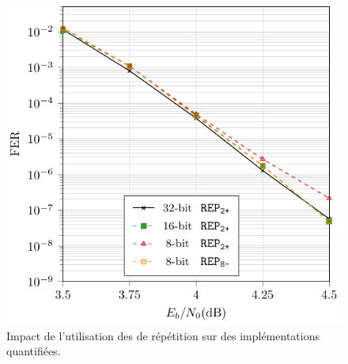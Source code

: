 \begin{figure}
\centering
\includegraphics{main/ch2_fig/curves/bfer/tikz/bfer_rep}
\caption{Impact de l'utilisation des \noeuds de répétition sur des implémentations quantifiées.}
\label{fig:bfer_rep}
\end{figure}
